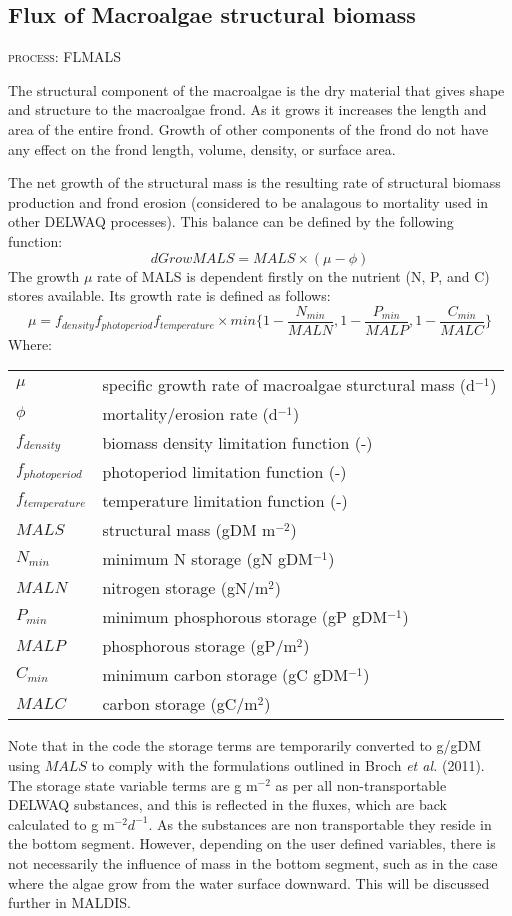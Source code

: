 \documentclass{deltares_manual}
\begin{document}
\subsection{Flux of Macroalgae structural biomass}
\begin{flushright}
\textsc{process: FLMALS}
\end{flushright}

The structural component of the macroalgae is the dry material that gives shape and structure to the macroalgae frond. As it grows it increases the length and area of the entire frond. Growth of other components of the frond do not have any effect on the frond length, volume, density, or surface area. 

The net growth of the structural mass is the resulting rate of structural biomass production and frond erosion (considered to be analagous to mortality used in other DELWAQ processes). This balance can be defined by the following function:
\[dGrowMALS =MALS \times (\mu - \phi)\]
The growth $\mu$ rate of MALS is dependent firstly on the nutrient (N, P, and C) stores available. Its growth rate is defined as follows:
\[\mu = f_{density} f_{photoperiod} f_{temperature}\times min\big\{1-\frac{N_{min}}{MALN},1-\frac{P_{min}}{MALP},1-\frac{C_{min}}{MALC}\big\}\]
Where:\\
\begin{tabular}{ll}
$\mu$  & specific growth rate of macroalgae sturctural mass (d$^{-1}$) \\
$\phi$ & mortality/erosion rate (d$^{-1}$) \\
$f_{density}$ & biomass density limitation function (-)\\
$f_{photoperiod}$ & photoperiod limitation function (-)\\
$f_{temperature}$ & temperature limitation function (-)\\
$MALS$ & structural mass (gDM m$^{-2}$)\\
$N_{min}$ & minimum N storage (gN gDM$^{-1}$)\\
$MALN$ & nitrogen storage (gN/m$^2$)\\
$P_{min}$ & minimum phosphorous storage (gP gDM$^{-1}$)\\
$MALP$ & phosphorous storage (gP/m$^2$)\\
$C_{min}$ & minimum carbon storage (gC gDM$^{-1}$)\\
$MALC$ & carbon storage (gC/m$^2$)\\
\end{tabular}

Note that in the code the storage terms are temporarily converted to g/gDM using $MALS$ to comply with the formulations outlined in Broch \textit{et al.} (2011). The storage state variable terms are g m$^{-2}$ as per all non-transportable DELWAQ substances, and this is reflected in the fluxes, which are back calculated to g m$^{-2}d^{-1}$. As the substances are non transportable they reside in the bottom segment. However, depending on the user defined variables, there is not necessarily the influence of mass in the bottom segment, such as in the case where the algae grow from the water surface downward. This will be discussed further in MALDIS.
\end{document}

